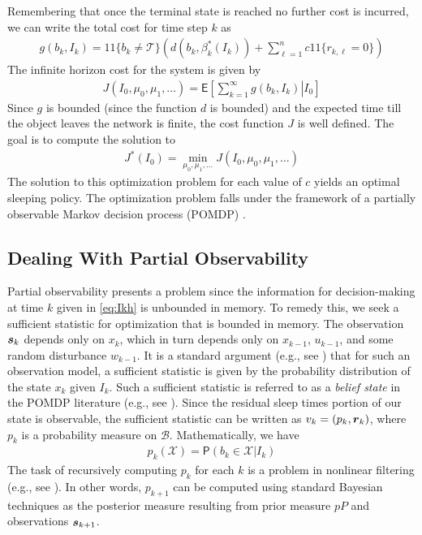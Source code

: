 \documentclass[journal,draftcls,onecolumn,11pt]{IEEEtran}
\newcommand{\emb}[1]{\text{\boldmath{$#1$}}}
\newcommand{\Prob}{\textsf{P}}
\newcommand{\Expect}{\textsf{E}}
\newcommand{\indic}[1]{\mbox{$1\!\!1$}{\{#1\}}}
\newcommand{\term}{\mathcal{T}}
\begin{document}
Remembering that once the terminal state is reached no further cost is incurred, we can write the total cost for time step $k$ as
\begin{align} \label{eq:gh}
   g(b_k,I_k) = \indic{b_k  \neq \term} \left(
      d\left(b_k,\beta_k^*(I_k)\right)
      + \sum_{\ell=1}^n c \indic{r_{k,\ell} = 0}
   \right)
\end{align}
The infinite horizon cost for the system is given by
\begin{align} \label{eq:tot_costh}
   J(I_0, \mu_0, \mu_1, \ldots) = \Expect \left[ \left. \sum_{k=1}^{\infty} g(b_k,I_k) \right| I_0 \right]
\end{align}
Since $g$ is bounded (since the function $d$ is bounded) and the expected time till the object leaves the network is finite, the cost function $J$ is well defined.  The goal is to compute the solution to
\begin{align} \label{eq:opt_probh}
   J^*(I_0)=\min_{\mu_0, \mu_1, \hdots} J(I_0, \mu_0, \mu_1, \ldots)
\end{align}
The solution to this optimization problem for each value of $c$ yields an optimal sleeping policy.  The optimization problem falls under the framework of a partially observable Markov decision process (POMDP) \cite{aberdeen03,littman95,monahan,Hauskrecht2000}.

\subsection{Dealing With Partial Observability}
Partial observability presents a problem since the information for decision-making at time $k$ given in \eqref{eq:Ikh} is unbounded in memory.  To remedy this, we seek a sufficient statistic for optimization that is bounded in memory.  The observation $\emb{s}_k$ depends only on $x_k$, which in turn depends only on $x_{k-1}$, $u_{k-1}$, and some random disturbance $w_{k-1}$.  It is a standard argument (e.g., see \cite{bertsekas07}) that for such an observation model, a sufficient statistic is given by the probability distribution of the state $x_k$ given $I_k$.  Such a sufficient statistic is referred to as a {\em belief state} in the POMDP literature (e.g., see \cite{aberdeen03,littman95}).  Since the residual sleep times portion of our state is observable, the sufficient statistic can be written as $v_k = (p_k, \emb{r}_k)$, where $p_k$ is a probability measure on $\mathcal{B}$.  Mathematically, we have
\begin{align} \label{eq:pkldefh}
   p_k(\mathcal{X}) = \Prob(b_k \in \mathcal{X}|I_k)
\end{align}
The task of recursively computing $p_k$ for each $k$ is a problem in nonlinear filtering (e.g., see \cite{doucet01}).  In other words, $p_{k+1}$ can be computed using standard Bayesian techniques as the posterior measure resulting from prior measure $p P$ and observations $\emb{s}_{k+1}$.
\end{document}
